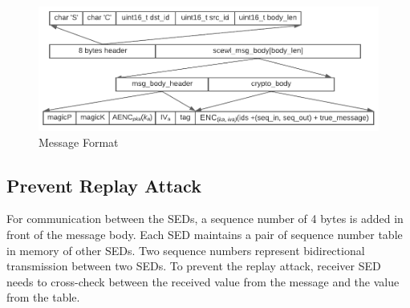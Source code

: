 \documentclass[11pt,oneside,onecolumn,letterpaper]{article}
\begin{document}
\begin{figure}[!htbp]
  \begin{centering}
  \includegraphics[width = .80\textwidth]{pic/msg-format.pdf}
  \caption{Message Format}
  \label{fig:msg}
  \end{centering}
\end{figure}

  \subsection{Prevent Replay Attack}
  For communication between the SEDs, a sequence number of 4 bytes is added in front of the message body. Each SED maintains a pair of sequence number table in memory of other SEDs. Two sequence numbers represent bidirectional transmission between two SEDs. To prevent the replay attack, receiver SED needs to cross-check between the received value from the message and the value from the table.
 
\end{document}
